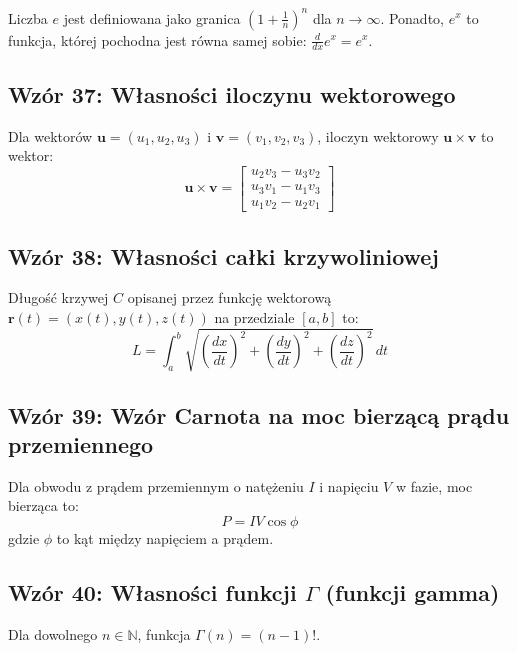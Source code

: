 \documentclass{article}
\begin{document}
Liczba \(e\) jest definiowana jako granica \((1 + \frac{1}{n})^n\) dla \(n \to \infty\). Ponadto, \(e^x\) to funkcja, której pochodna jest równa samej sobie: \(\frac{d}{dx} e^x = e^x\).

\subsection*{Wzór 37: Własności iloczynu wektorowego}

Dla wektorów \(\mathbf{u} = (u_1, u_2, u_3)\) i \(\mathbf{v} = (v_1, v_2, v_3)\), iloczyn wektorowy \(\mathbf{u} \times \mathbf{v}\) to wektor:
\[ \mathbf{u} \times \mathbf{v} = \begin{bmatrix} u_2v_3 - u_3v_2 \\ u_3v_1 - u_1v_3 \\ u_1v_2 - u_2v_1 \end{bmatrix} \]

\subsection*{Wzór 38: Własności całki krzywoliniowej}

Długość krzywej \(C\) opisanej przez funkcję wektorową \(\mathbf{r}(t) = (x(t), y(t), z(t))\) na przedziale \([a, b]\) to:
\[ L = \int_{a}^{b} \sqrt{\left(\frac{dx}{dt}\right)^2 + \left(\frac{dy}{dt}\right)^2 + \left(\frac{dz}{dt}\right)^2} \,dt \]

\subsection*{Wzór 39: Wzór Carnota na moc bierzącą prądu przemiennego}

Dla obwodu z prądem przemiennym o natężeniu \(I\) i napięciu \(V\) w fazie, moc bierząca to:
\[ P = IV\cos\phi \]
gdzie \(\phi\) to kąt między napięciem a prądem.

\subsection*{Wzór 40: Własności funkcji \(\Gamma\) (funkcji gamma)}

Dla dowolnego \(n \in \mathbb{N}\), funkcja \(\Gamma(n) = (n-1)!\).
\end{document}
